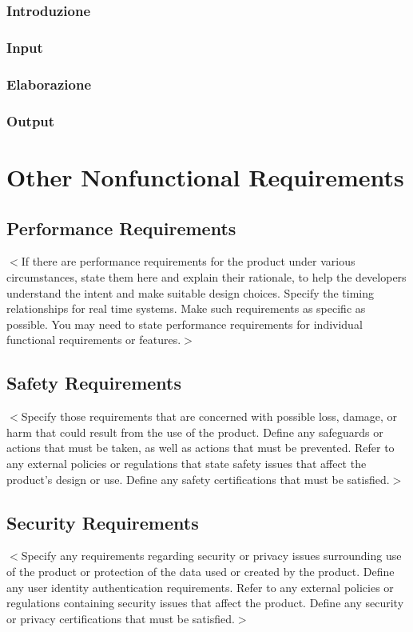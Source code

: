 \documentclass{scrreprt}
\begin{document}
\section{}

\subsection*{Introduzione}
\subsection*{Input}
\subsection*{Elaborazione}
\subsection*{Output}


\chapter{Other Nonfunctional Requirements}

\section{Performance Requirements}
$<$If there are performance requirements for the product under various 
circumstances, state them here and explain their rationale, to help the 
developers understand the intent and make suitable design choices. Specify the 
timing relationships for real time systems. Make such requirements as specific 
as possible. You may need to state performance requirements for individual 
functional requirements or features.$>$

\section{Safety Requirements}
$<$Specify those requirements that are concerned with possible loss, damage, or 
harm that could result from the use of the product. Define any safeguards or 
actions that must be taken, as well as actions that must be prevented. Refer to 
any external policies or regulations that state safety issues that affect the 
product’s design or use. Define any safety certifications that must be 
satisfied.$>$

\section{Security Requirements}
$<$Specify any requirements regarding security or privacy issues surrounding use 
of the product or protection of the data used or created by the product. Define 
any user identity authentication requirements. Refer to any external policies or 
regulations containing security issues that affect the product. Define any 
security or privacy certifications that must be satisfied.$>$
\end{document}
